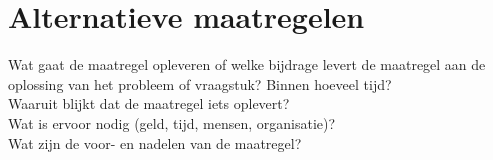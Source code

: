 \newpage
\section{Alternatieve maatregelen}
  Wat gaat de maatregel opleveren of welke bijdrage levert de maatregel aan de oplossing van het probleem of vraagstuk? Binnen hoeveel tijd? \\
  Waaruit blijkt dat de maatregel iets oplevert? \\
  Wat is ervoor nodig (geld, tijd, mensen, organisatie)? \\
  Wat zijn de voor- en nadelen van de maatregel? \\